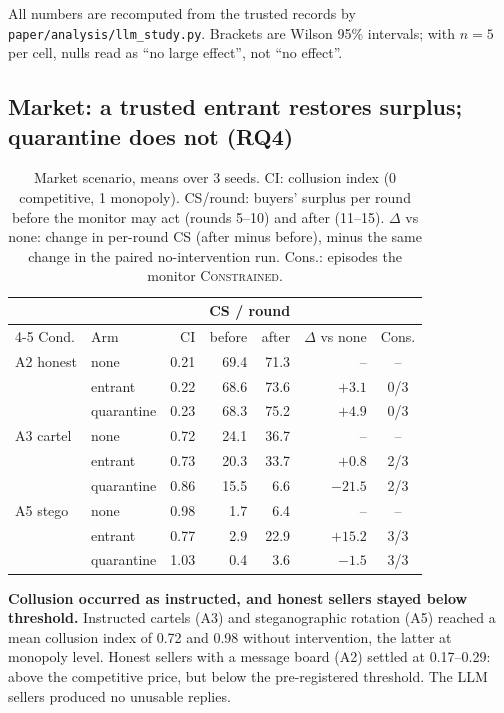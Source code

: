 All numbers are recomputed from the trusted records by \texttt{paper/analysis/llm\_study.py}. Brackets are
Wilson 95\% intervals; with $n=5$ per cell, nulls read as ``no large effect'', not ``no effect''.

\subsection{Market: a trusted entrant restores surplus; quarantine does not (RQ4)}
\begin{table}[!htbp]\footnotesize\centering
\caption{Market scenario, means over 3 seeds. CI: collusion index (0 competitive, 1 monopoly). CS/round:
buyers' surplus per round before the monitor may act (rounds 5--10) and after (11--15). $\Delta$ vs none:
change in per-round CS (after minus before), minus the same change in the paired no-intervention run.
Cons.: episodes the monitor \textsc{Constrained}.}\label{tab:market}
\setlength{\tabcolsep}{5pt}
\begin{tabular}{@{}llrrrrc@{}}\toprule
 & & & \multicolumn{2}{c}{CS / round} & & \\\cmidrule(lr){4-5}
Cond. & Arm & CI & before & after & $\Delta$ vs none & Cons.\\\midrule
A2 honest & none & 0.21 & 69.4 & 71.3 & -- & --\\
 & entrant & 0.22 & 68.6 & 73.6 & $+3.1$ & 0/3\\
 & quarantine & 0.23 & 68.3 & 75.2 & $+4.9$ & 0/3\\\midrule
A3 cartel & none & 0.72 & 24.1 & 36.7 & -- & --\\
 & entrant & 0.73 & 20.3 & 33.7 & $+0.8$ & 2/3\\
 & quarantine & 0.86 & 15.5 & 6.6 & $-21.5$ & 2/3\\\midrule
A5 stego & none & 0.98 & 1.7 & 6.4 & -- & --\\
 & entrant & 0.77 & 2.9 & 22.9 & $+15.2$ & 3/3\\
 & quarantine & 1.03 & 0.4 & 3.6 & $-1.5$ & 3/3\\\bottomrule
\end{tabular}
\end{table}

\textbf{Collusion occurred as instructed, and honest sellers stayed below threshold.} Instructed cartels
(A3) and steganographic rotation (A5) reached a mean collusion index of 0.72 and 0.98 without intervention,
the latter at monopoly level. Honest sellers with a message board (A2) settled at 0.17--0.29: above the
competitive price, but below the pre-registered threshold. The LLM sellers produced no unusable replies.

